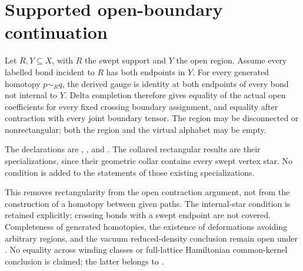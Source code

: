 \documentclass{article}
\begin{document}
\section{Supported open-boundary continuation}
Let $R,Y\subseteq X$, with $R$ the swept support and $Y$ the open region.
Assume every labelled bond incident to $R$ has both endpoints in $Y$.
For every generated homotopy $p\sim_R q$, the derived gauge is identity
at both endpoints of every bond not internal to $Y$. Delta completion
therefore gives equality of the actual open coefficients for every fixed
crossing boundary assignment, and equality after contraction with every
joint boundary tensor. The region may be disconnected or nonrectangular;
both the region and the virtual alphabet may be empty.

The declarations are
,
, and
.
The collared rectangular results are their specializations, since their
geometric collar contains every swept vertex star. No condition is added
to the statements of those existing specializations.

This removes rectangularity from the open contraction argument, not from
the construction of a homotopy between given paths. The internal-star
condition is retained explicitly: crossing bonds with a swept endpoint
are not covered. Completeness of generated homotopies, the existence of
deformations avoiding arbitrary regions, and the vacuum reduced-density
conclusion remain open under . No equality across winding
classes or full-lattice Hamiltonian common-kernel conclusion is claimed;
the latter belongs to .



\end{document}
